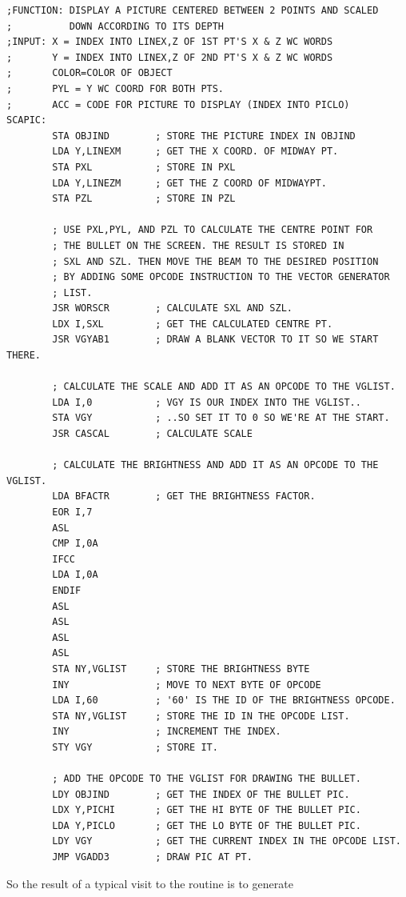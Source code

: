 \clearpage
\begin{lstlisting}
;FUNCTION: DISPLAY A PICTURE CENTERED BETWEEN 2 POINTS AND SCALED
;          DOWN ACCORDING TO ITS DEPTH
;INPUT: X = INDEX INTO LINEX,Z OF 1ST PT'S X & Z WC WORDS
;       Y = INDEX INTO LINEX,Z OF 2ND PT'S X & Z WC WORDS
;       COLOR=COLOR OF OBJECT
;       PYL = Y WC COORD FOR BOTH PTS.
;       ACC = CODE FOR PICTURE TO DISPLAY (INDEX INTO PICLO)
SCAPIC:
        STA OBJIND        ; STORE THE PICTURE INDEX IN OBJIND
        LDA Y,LINEXM      ; GET THE X COORD. OF MIDWAY PT.
        STA PXL           ; STORE IN PXL
        LDA Y,LINEZM      ; GET THE Z COORD OF MIDWAYPT.
        STA PZL           ; STORE IN PZL
    
        ; USE PXL,PYL, AND PZL TO CALCULATE THE CENTRE POINT FOR
        ; THE BULLET ON THE SCREEN. THE RESULT IS STORED IN
        ; SXL AND SZL. THEN MOVE THE BEAM TO THE DESIRED POSITION
        ; BY ADDING SOME OPCODE INSTRUCTION TO THE VECTOR GENERATOR
        ; LIST.
        JSR WORSCR        ; CALCULATE SXL AND SZL.
        LDX I,SXL         ; GET THE CALCULATED CENTRE PT.
        JSR VGYAB1        ; DRAW A BLANK VECTOR TO IT SO WE START THERE.
    
        ; CALCULATE THE SCALE AND ADD IT AS AN OPCODE TO THE VGLIST.
        LDA I,0           ; VGY IS OUR INDEX INTO THE VGLIST..
        STA VGY           ; ..SO SET IT TO 0 SO WE'RE AT THE START.
        JSR CASCAL        ; CALCULATE SCALE
    
        ; CALCULATE THE BRIGHTNESS AND ADD IT AS AN OPCODE TO THE VGLIST.
        LDA BFACTR        ; GET THE BRIGHTNESS FACTOR.
        EOR I,7
        ASL
        CMP I,0A
        IFCC
        LDA I,0A
        ENDIF
        ASL
        ASL
        ASL
        ASL
        STA NY,VGLIST     ; STORE THE BRIGHTNESS BYTE
        INY               ; MOVE TO NEXT BYTE OF OPCODE
        LDA I,60          ; '60' IS THE ID OF THE BRIGHTNESS OPCODE.
        STA NY,VGLIST     ; STORE THE ID IN THE OPCODE LIST.
        INY               ; INCREMENT THE INDEX.
        STY VGY           ; STORE IT.
    
        ; ADD THE OPCODE TO THE VGLIST FOR DRAWING THE BULLET.
        LDY OBJIND        ; GET THE INDEX OF THE BULLET PIC.
        LDX Y,PICHI       ; GET THE HI BYTE OF THE BULLET PIC.
        LDA Y,PICLO       ; GET THE LO BYTE OF THE BULLET PIC.
        LDY VGY           ; GET THE CURRENT INDEX IN THE OPCODE LIST.
        JMP VGADD3        ; DRAW PIC AT PT.
\end{lstlisting}
So the result of a typical visit to the  routine is to generate 
